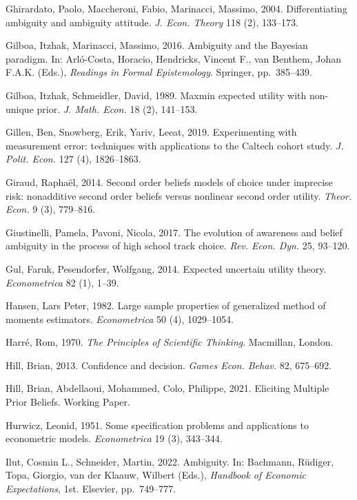 \documentclass[12pt,a4paper]{article}
\newenvironment{original}
  {\par\medskip\noindent\color{black}\ignorespaces}
  {\par\medskip}
\begin{document}
\begin{original}
\noindent Ghirardato, Paolo, Maccheroni, Fabio, Marinacci, Massimo, 2004. Differentiating ambiguity and ambiguity attitude. \textit{J. Econ. Theory} 118 (2), 133--173.

\noindent Gilboa, Itzhak, Marinacci, Massimo, 2016. Ambiguity and the Bayesian paradigm. In: Arl\'{o}-Costa, Horacio, Hendricks, Vincent F., van Benthem, Johan F.A.K. (Eds.), \textit{Readings in Formal Epistemology}. Springer, pp.\ 385--439.

\noindent Gilboa, Itzhak, Schmeidler, David, 1989. Maxmin expected utility with non-unique prior. \textit{J. Math. Econ.} 18 (2), 141--153.

\noindent Gillen, Ben, Snowberg, Erik, Yariv, Leeat, 2019. Experimenting with measurement error: techniques with applications to the Caltech cohort study. \textit{J. Polit. Econ.} 127 (4), 1826--1863.

\noindent Giraud, Rapha\"{e}l, 2014. Second order beliefs models of choice under imprecise risk: nonadditive second order beliefs versus nonlinear second order utility. \textit{Theor. Econ.} 9 (3), 779--816.

\noindent Giustinelli, Pamela, Pavoni, Nicola, 2017. The evolution of awareness and belief ambiguity in the process of high school track choice. \textit{Rev. Econ. Dyn.} 25, 93--120.

\noindent Gul, Faruk, Pesendorfer, Wolfgang, 2014. Expected uncertain utility theory. \textit{Econometrica} 82 (1), 1--39.

\noindent Hansen, Lars Peter, 1982. Large sample properties of generalized method of moments estimators. \textit{Econometrica} 50 (4), 1029--1054.

\noindent Harr\'{e}, Rom, 1970. \textit{The Principles of Scientific Thinking}. Macmillan, London.

\noindent Hill, Brian, 2013. Confidence and decision. \textit{Games Econ. Behav.} 82, 675--692.

\noindent Hill, Brian, Abdellaoui, Mohammed, Colo, Philippe, 2021. Eliciting Multiple Prior Beliefs. Working Paper.

\noindent Hurwicz, Leonid, 1951. Some specification problems and applications to econometric models. \textit{Econometrica} 19 (3), 343--344.

\noindent Ilut, Cosmin L., Schneider, Martin, 2022. Ambiguity. In: Bachmann, R\"{u}diger, Topa, Giorgio, van der Klaauw, Wilbert (Eds.), \textit{Handbook of Economic Expectations}, 1st. Elsevier, pp.\ 749--777.


\end{original}
\end{document}
